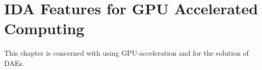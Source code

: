 \chapter{IDA Features for GPU Accelerated Computing}\label{s:idagpu}

This chapter is concerned with using GPU-acceleration and {\ida} for the solution
of DAEs.


